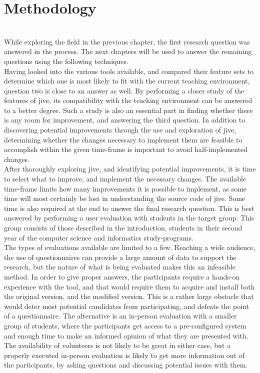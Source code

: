 \chapter{Methodology}\label{methodology}
~\\
While exploring the field in the previous chapter, the first research question was answered in the process.
The next chapters will be used to answer the remaining questions using the following techniques.
~\\

Having looked into the various tools available, and compared their feature sets to determine which one is most likely to fit with the current teaching environment, question two is close to an answer as well.
By performing a closer study of the features of \gls{jive}, its compatibility with the teaching environment can be answered to a better degree.
Such a study is also an essential part in finding whether there is any room for improvement, and answering the third question.
In addition to discovering potential improvements through the use and exploration of \gls{jive}, determining whether the changes necessary to implement them are feasible to accomplish within the given time-frame is important to avoid half-implemented changes.
~\\

After thoroughly exploring \gls{jive}, and identifying potential improvements, it is time to select what to improve, and implement the necessary changes.
The available time-frame limits how many improvements it is possible to implement, as some time will most certainly be lost in understanding the source code of \gls{jive}.
Some time is also required at the end to answer the final research question.
This is best answered by performing a user evaluation with students in the target group.
This group consists of those described in the introduction, students in their second year of the computer science and informatics study-programs.
~\\

The types of evaluations available are limited to a few.
Reaching a wide audience, the use of questionnaires can provide a large amount of data to support the research, but the nature of what is being evaluated makes this an infeasible method.
In order to give proper answers, the participants require a hands-on experience with the tool, and that would require them to acquire and install both the original version, and the modified version.
This is a rather large obstacle that would deter most potential candidates from participating, and defeats the point of a questionnaire.
The alternative is an in-person evaluation with a smaller group of students, where the participants get access to a pre-configured system and enough time to make an informed opinion of what they are presented with.
The availability of volunteers is not likely to be great in either case, but a properly executed in-person evaluation is likely to get more information out of the participants, by asking questions and discussing potential issues with them.


